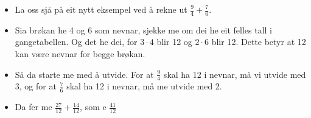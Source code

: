 \documentclass[english,hidelinks,pdftex, 11 pt, class=report,crop=false]{standalone}
\begin{document}
\begin{itemize}
\item La oss sjå på eit nytt eksempel ved å rekne ut $ \frac{9}{4} +\frac{7}{6}$.
\item Sia brøkan he 4 og 6 som nevnar, sjekke me om dei he eit felles tall i gangetabellen. Og det he dei, for $3\cdot 4 $ blir 12 og $ 2\cdot 6 $ blir 12. Dette betyr at 12 kan være nevnar for begge brøkan.
\item Så da starte me med å utvide. For at $ \frac{9}{4}  $ skal ha 12 i nevnar, må vi utvide med 3, og for at $ \frac{7}{6} $ skal ha 12 i nevnar, må me utvide med 2.
\item Da fer me $ \frac{27}{12}+\frac{14}{12} $, som e $ \frac{41}{12} $
\end{itemize}
\end{document}
